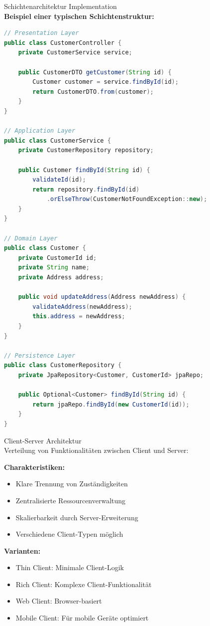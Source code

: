 \begin{example2}{Schichtenarchitektur Implementation}\\
\textbf{Beispiel einer typischen Schichtenstruktur:}

\begin{lstlisting}[language=Java, style=basesmol]
// Presentation Layer
public class CustomerController {
    private CustomerService service;
    
    public CustomerDTO getCustomer(String id) {
        Customer customer = service.findById(id);
        return CustomerDTO.from(customer);
    }
}

// Application Layer
public class CustomerService {
    private CustomerRepository repository;
    
    public Customer findById(String id) {
        validateId(id);
        return repository.findById(id)
            .orElseThrow(CustomerNotFoundException::new);
    }
}

// Domain Layer
public class Customer {
    private CustomerId id;
    private String name;
    private Address address;
    
    public void updateAddress(Address newAddress) {
        validateAddress(newAddress);
        this.address = newAddress;
    }
}

// Persistence Layer
public class CustomerRepository {
    private JpaRepository<Customer, CustomerId> jpaRepo;
    
    public Optional<Customer> findById(String id) {
        return jpaRepo.findById(new CustomerId(id));
    }
}
\end{lstlisting}
\end{example2}



\begin{concept}{Client-Server Architektur}\\
Verteilung von Funktionalitäten zwischen Client und Server:

\textbf{Charakteristiken:}
\begin{itemize}
    \item Klare Trennung von Zuständigkeiten
    \item Zentralisierte Ressourcenverwaltung
    \item Skalierbarkeit durch Server-Erweiterung
    \item Verschiedene Client-Typen möglich
\end{itemize}

\textbf{Varianten:}
\begin{itemize}
    \item Thin Client: Minimale Client-Logik
    \item Rich Client: Komplexe Client-Funktionalität
    \item Web Client: Browser-basiert
    \item Mobile Client: Für mobile Geräte optimiert
\end{itemize}
\end{concept}





